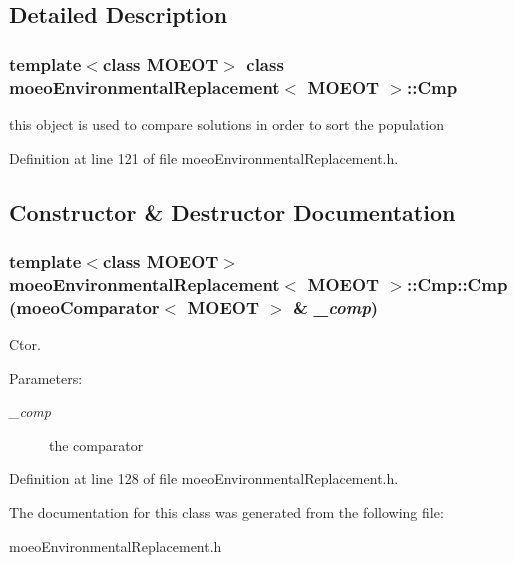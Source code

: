 \subsection{Detailed Description}
\subsubsection*{template$<$class MOEOT$>$ class moeo\-Environmental\-Replacement$<$ MOEOT $>$::Cmp}

this object is used to compare solutions in order to sort the population 



Definition at line 121 of file moeo\-Environmental\-Replacement.h.

\subsection{Constructor \& Destructor Documentation}
\subsubsection{\setlength{\rightskip}{0pt plus 5cm}template$<$class MOEOT$>$ \bf{moeo\-Environmental\-Replacement}$<$ MOEOT $>$::Cmp::Cmp (\bf{moeo\-Comparator}$<$ MOEOT $>$ \& {\em \_\-comp})\hspace{0.3cm}{\tt  [inline]}}\label{classmoeoEnvironmentalReplacement_1_1Cmp_efd55b365f306715f1a871b50d479f38}


Ctor. 

\begin{Desc}
\item[Parameters:]
\begin{description}
\item[{\em \_\-comp}]the comparator \end{description}
\end{Desc}


Definition at line 128 of file moeo\-Environmental\-Replacement.h.

The documentation for this class was generated from the following file:\begin{CompactItemize}
\item 
moeo\-Environmental\-Replacement.h\end{CompactItemize}
